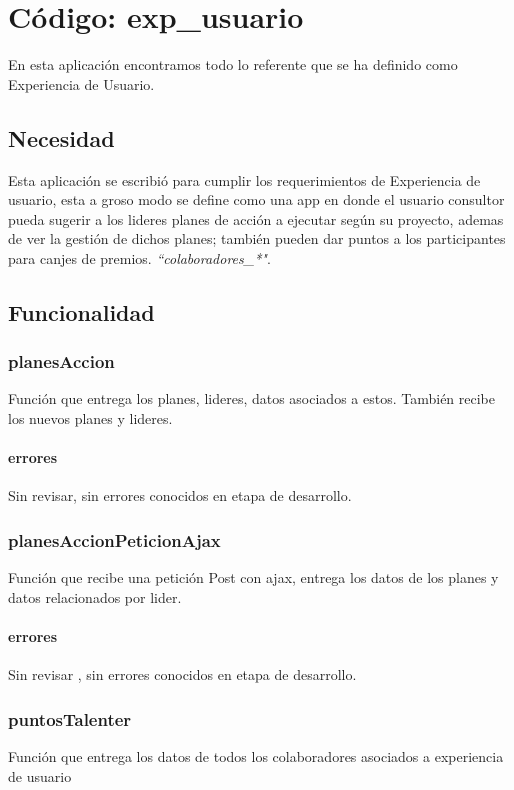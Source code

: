 \documentclass[10pt,a4paper]{book}
\begin{document}
	\chapter{Código: exp\_usuario}
	
	En esta aplicación encontramos todo lo referente que se ha definido como Experiencia de Usuario.
	
	\section{Necesidad}
	
	Esta aplicación se escribió para cumplir los requerimientos de Experiencia de usuario, esta a groso modo se define como una app en donde el usuario consultor pueda sugerir a los lideres planes de acción a ejecutar según su proyecto, ademas de ver la gestión de dichos planes; también pueden dar puntos a los participantes para canjes de premios. \textit{``colaboradores\_*"}.
	
	\section{Funcionalidad}
	
	\subsection{planesAccion}
	Función que entrega los planes, lideres, datos asociados a estos. También recibe los nuevos planes y lideres.
	
	\subsubsection{errores}
	Sin revisar, sin errores conocidos en etapa de desarrollo.
	
	\subsection{ planesAccionPeticionAjax}
	Función  que recibe una petición Post con ajax, entrega los datos de los planes y datos relacionados por lider.
	
	\subsubsection{errores}
	Sin revisar , sin errores conocidos en etapa de desarrollo.
	
	\subsection{puntosTalenter}
	Función que entrega los datos de todos los colaboradores asociados a experiencia de usuario
\end{document}
